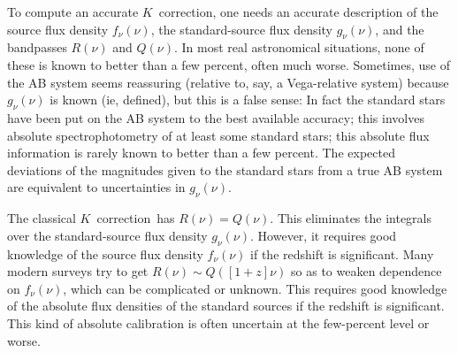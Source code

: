 \documentclass[preprint]{aastex}
\newcommand{\kcorrection}{$K$~correction}
\begin{document}
To compute an accurate \kcorrection, one needs an accurate description
of the source flux density $f_{\nu}(\nu)$, the standard-source flux
density $g_{\nu}(\nu)$, and the bandpasses $R(\nu)$ and $Q(\nu)$.  In
most real astronomical situations, none of these is known to better
than a few percent, often much worse.  Sometimes, use of the AB system
seems reassuring (relative to, say, a Vega-relative system) because
$g_{\nu}(\nu)$ is known (ie, defined), but this is a false sense: In
fact the standard stars have been put on the AB system to the best
available accuracy; this involves absolute spectrophotometry of at
least some standard stars; this absolute flux information is rarely
known to better than a few percent.  The expected deviations of the
magnitudes given to the standard stars from a true AB system are
equivalent to uncertainties in $g_{\nu}(\nu)$.

The classical \kcorrection\ has $R(\nu)=Q(\nu)$.  This eliminates the
integrals over the standard-source flux density $g_{\nu}(\nu)$.
However, it requires good knowledge of the source flux density
$f_{\nu}(\nu)$ if the redshift is significant.  Many modern surveys
try to get $R(\nu)\sim Q([1+z]\nu)$ so as to weaken dependence on
$f_{\nu}(\nu)$, which can be complicated or unknown.  This requires
good knowledge of the absolute flux densities of the standard sources
if the redshift is significant.  This kind of absolute calibration is
often uncertain at the few-percent level or worse.



\end{document}
